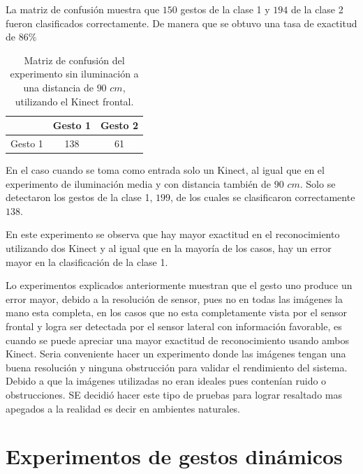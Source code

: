 \begin{itemize}
La matriz de confusión muestra que $150$ gestos de la clase 1 y $194$ de la clase 2 fueron clasificados correctamente. De manera que se obtuvo una tasa de exactitud de $86 \%$ 

\begin{table}[h!] 
\begin{center}
\begin{tabular}{ r || c | c |} 
 
        & Gesto 1 & Gesto 2 \\ \hline \hline  
Gesto 1 & 138     &  61     \\ \hline  
\end{tabular}
\end{center} 
\caption{Matriz de confusión del experimento sin iluminación a una distancia de $90$ $cm$, utilizando el Kinect frontal.}
\label{table:90LnoK1}
\end{table} 

En el caso cuando se toma como entrada solo un Kinect, al igual que en el experimento de iluminación media y con distancia también de $90$ $cm$. Solo se detectaron los gestos de la clase 1, $199$, de los cuales se clasificaron correctamente $138$. 

En este experimento se observa que hay mayor exactitud en el reconocimiento utilizando dos Kinect y al igual que en la mayoría de los casos, hay un error mayor en la clasificación de la clase 1. 


\end{itemize}

Lo experimentos explicados anteriormente muestran que el gesto uno produce un error mayor, debido a la resolución de sensor, pues no en todas las imágenes la mano esta completa, en los casos que no esta completamente vista por el sensor frontal y logra ser detectada por el sensor lateral con información favorable, es cuando se puede apreciar una mayor exactitud de reconocimiento usando ambos Kinect. 
Seria conveniente hacer un experimento donde las imágenes tengan una buena resolución y ninguna obstrucción para validar el rendimiento del sistema. Debido a que la imágenes utilizadas no eran ideales pues contenían  ruido o obstrucciones. SE decidió hacer este tipo de pruebas para lograr resaltado mas apegados a la realidad es decir en ambientes naturales. 
  



\section{Experimentos de gestos dinámicos}\label{TestDinamicGestures} 


